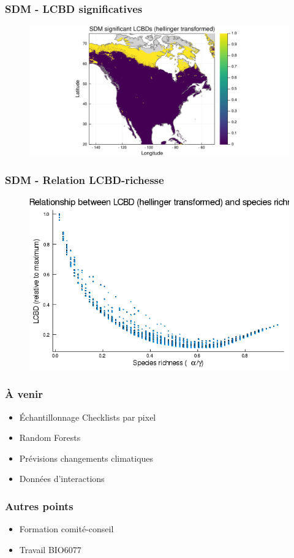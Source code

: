 \documentclass[10pt]{beamer}
\begin{document}
\begin{frame}
  \frametitle{SDM - LCBD significatives}
  \begin{figure}
    \centering
    \hspace*{-2cm}\includegraphics[scale=0.5]{../fig/sdm/sdm-lcbd-signif.pdf}
  \end{figure}
\end{frame}

\begin{frame}
  \frametitle{SDM - Relation LCBD-richesse}
  \begin{figure}
    \centering
    \hspace*{-2cm}\includegraphics[scale=0.5]{../fig/sdm/sdm-relation-lcbd-richness-transf.png}
  \end{figure}
\end{frame}

\begin{frame}
  \frametitle{À venir}
  \begin{itemize}
    \item Échantillonnage Checklists par pixel
    \item Random Forests
    \item Prévisions changements climatiques
    \item Données d'interactions
  \end{itemize}
\end{frame}

\begin{frame}
  \frametitle{Autres points}
  \begin{itemize}
    \item Formation comité-conseil
    \item Travail BIO6077
  \end{itemize}
\end{frame}
\end{document}
